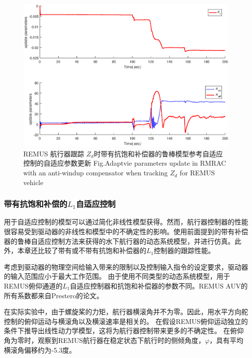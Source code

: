 \begin{figure}[!htp]%
\centering
\includegraphics[width=15cm]{figure/chap6/Fig6_cmdpulse_3.eps}
\label{fig:chap6:F15}
 {REMUS 航行器跟踪 $Z_{d}$时带有抗饱和补偿器的鲁棒模型参考自适应控制的自适应参数更新} {Fig.}{Adaptvie parameters update in RMRAC with an anti-windup compensator when tracking $Z_{d}$ for REMUS vehicle}
\end{figure}

\subsubsection{带有抗饱和补偿的$L_1$自适应控制}

用于自适应控制的模型可以通过简化非线性模型获得。然而，航行器控制器的性能很容易受到驱动器的非线性和模型中的不确定性的影响。使用前面提到的带有补偿器的鲁棒自适应控制方法来获得的水下航行器的动态系统模型，并进行仿真。此外，本章还比较了带有或不带有抗饱和补偿器的$L_1$控制器的跟踪性能。

考虑到驱动器的物理空间给输入带来的限制以及控制输入指令的设定要求，驱动器的输入范围应小于最大工作范围。 由于使用不同类型的动态系统模型，用于REMUS俯仰通道的$L_{1}$自适应控制器和抗饱和补偿器的参数不同。REMUS AUV的所有系数都来自Prestero的论文\cite{prestero2001verification}。

在实际实验中，由于螺旋桨的力矩，航行器横滚角并不为零。因此，用水平方向舵控制的俯仰运动与横滚角以及横滚速率是相关的。 在假设REMUS俯仰运动独立的条件下推导出线性动力学模型，这将为航行器控制带来更多的不确定性。 在俯仰角为零时，观察到REMUS航行器在稳定状态下航行时的侧倾角度，$\varphi$，具有平均横滚角偏移约为-5.3度。

